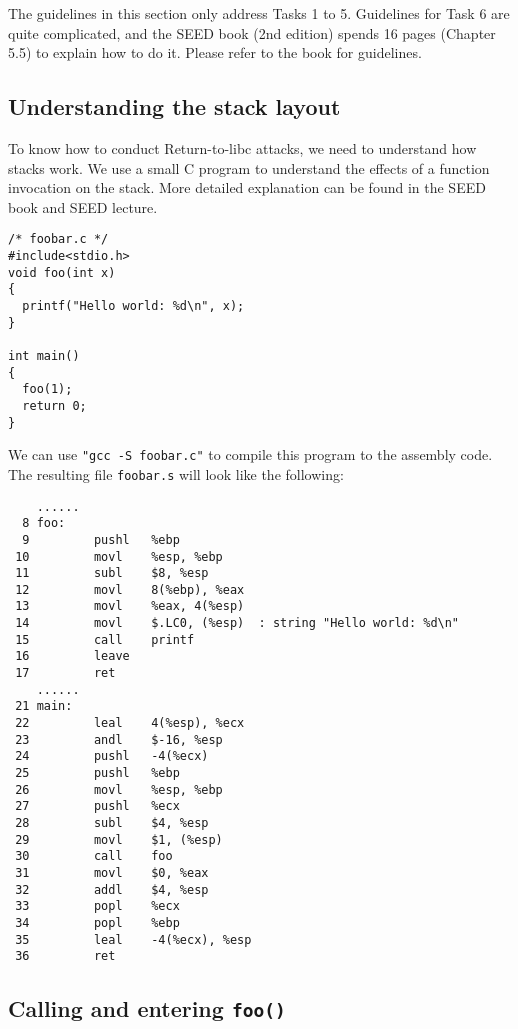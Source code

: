 The guidelines in this section only address Tasks 1 to 5. 
Guidelines for Task 6 are quite complicated, 
and the SEED book (2nd edition) spends 16 pages (Chapter 5.5) 
to explain how to do it. Please refer to the book for guidelines. 


\subsection{Understanding the stack layout}

To know how to conduct Return-to-libc attacks, we need to 
understand how stacks work.  We use a small C program to understand 
the effects of a function invocation on the stack. More detailed 
explanation can be found in the SEED book and SEED lecture. 


\begin{lstlisting}
/* foobar.c */
#include<stdio.h>
void foo(int x)
{
  printf("Hello world: %d\n", x);
}

int main()
{
  foo(1);
  return 0;
}
\end{lstlisting}

We can use {\tt "gcc -S foobar.c"} to
compile this program to the assembly code.
The resulting file {\tt foobar.s} will look like the following:


\begin{lstlisting}
    ......
  8 foo:
  9         pushl   %ebp
 10         movl    %esp, %ebp
 11         subl    $8, %esp
 12         movl    8(%ebp), %eax   
 13         movl    %eax, 4(%esp)
 14         movl    $.LC0, (%esp)  : string "Hello world: %d\n"
 15         call    printf
 16         leave
 17         ret
    ......
 21 main:
 22         leal    4(%esp), %ecx
 23         andl    $-16, %esp
 24         pushl   -4(%ecx)
 25         pushl   %ebp
 26         movl    %esp, %ebp
 27         pushl   %ecx
 28         subl    $4, %esp
 29         movl    $1, (%esp)
 30         call    foo
 31         movl    $0, %eax
 32         addl    $4, %esp
 33         popl    %ecx
 34         popl    %ebp
 35         leal    -4(%ecx), %esp
 36         ret
\end{lstlisting}
 


\subsection{Calling and entering {\tt foo()}}

